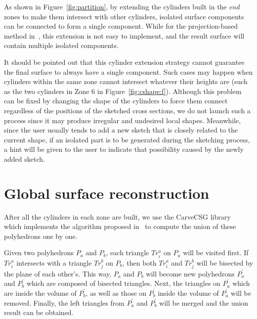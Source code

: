 As shown in Figure~\ref{fig:partition}, by extending the cylinders
built in the \textit{end} zones to make them intersect with other
cylinders, isolated surface components can be connected to form a
single component. While for the projection-based method
in~\cite{LBDLJ08}, this extension is not easy to implement, and the
result surface will contain multiple isolated components.

It should be pointed out that this cylinder extension  strategy
cannot guarantee the final surface to always have a single
component. Such cases may happen when cylinders within the same zone
cannot intersect whatever their heights are (such as the two
cylinders in Zone 6 in Figure~\ref{fig:cshape:f}). Although this
problem can be fixed by changing the shape of the cylinders to force
them connect regardless of the positions of the sketched cross
sections, we do not launch such a process since it may produce
irregular and undesired local shapes. Meanwhile, since the user
usually tends to add a new sketch that is closely related to the
current shape, if an isolated part is to be generated during the
sketching process, a hint will be given to the user to indicate that
possibility caused by the newly added sketch.


\section{Global surface reconstruction} \label{ch4:sec:algo:global}


After all the cylinders in each zone are built, we use the
CarveCSG library~\cite{CarveCSG} which implements the algorithm proposed
in~\cite{LTH86} to compute the union of these polyhedrons one by one.

Given two polyhedrons $P_a$ and $P_b$, each triangle $Tr^a_i$ on $P_a$ will be
visited first. If $Tr^a_i$ intersects with a triangle $Tr^b_j$ on $P_b$, then
both $Tr^a_i$ and $Tr^b_j$ will be bisected by the plane of each other's.
This way, $P_a$ and $P_b$ will become new polyhedrons $P^\prime_a$ and
$P^\prime_b$ which are composed of bisected triangles. Next, the triangles on
$P^\prime_a$ which are inside the volume of $P^\prime_b$, as well as
those on $P^\prime_b$ inside the volume of $P^\prime_a$ will be removed.
Finally, the left triangles from $P^\prime_a$ and $P^\prime_b$ will
be merged and the union result can be obtained.

